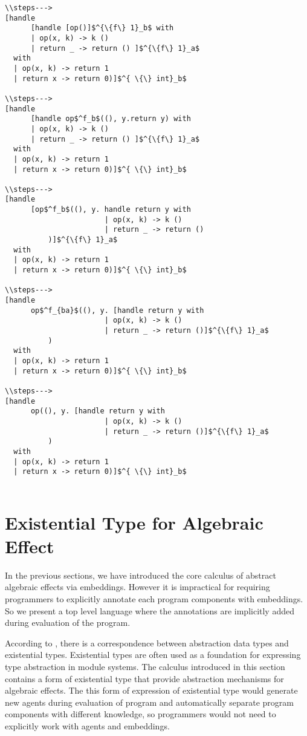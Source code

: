 \begin{lstlisting}
\\steps--->
[handle 
      [handle [op()]$^{\{f\} 1}_b$ with
      | op(x, k) -> k ()
      | return _ -> return () ]$^{\{f\} 1}_a$ 
  with 
  | op(x, k) -> return 1
  | return x -> return 0)]$^{ \{\} int}_b$
  
\\steps--->
[handle 
      [handle op$^f_b$((), y.return y) with
      | op(x, k) -> k ()
      | return _ -> return () ]$^{\{f\} 1}_a$ 
  with 
  | op(x, k) -> return 1
  | return x -> return 0)]$^{ \{\} int}_b$
  
\\steps--->
[handle 
      [op$^f_b$((), y. handle return y with
                       | op(x, k) -> k ()
                       | return _ -> return () 
          )]$^{\{f\} 1}_a$ 
  with 
  | op(x, k) -> return 1
  | return x -> return 0)]$^{ \{\} int}_b$
  
\\steps--->
[handle 
      op$^f_{ba}$((), y. [handle return y with
                       | op(x, k) -> k ()
                       | return _ -> return ()]$^{\{f\} 1}_a$ 
          )
  with 
  | op(x, k) -> return 1
  | return x -> return 0)]$^{ \{\} int}_b$
  
\\steps--->
[handle 
      op((), y. [handle return y with
                       | op(x, k) -> k ()
                       | return _ -> return ()]$^{\{f\} 1}_a$ 
          )
  with 
  | op(x, k) -> return 1
  | return x -> return 0)]$^{ \{\} int}_b$
  
\end{lstlisting}


\section{Existential Type for Algebraic Effect}
\label{sec-exist}
In the previous sections, we have introduced the core calculus of abstract algebraic effects via embeddings. However it is  impractical for requiring programmers to explicitly annotate each program components with embeddings. So we present a top level language where the annotations are implicitly added during evaluation of the program.  

According to \citet{mitchell88}, there is a correspondence between abstraction data types and existential types. Existential types are often used as a foundation for expressing type abstraction in module systems. The  calculus introduced in this section contains a form of existential type that provide abstraction mechanisms for algebraic effects. The this form of expression of existential type would generate new agents during evaluation of program and automatically separate program components with different knowledge, so programmers would not need to explicitly work with agents and embeddings.

